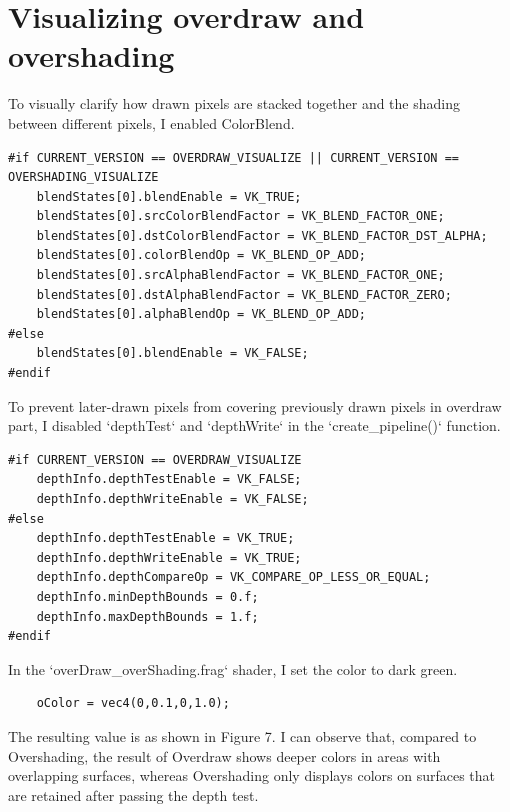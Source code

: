 \documentclass[10pt]{article}
\begin{document}
\section{Visualizing overdraw and overshading}

\noindent To visually clarify how drawn pixels are stacked together and the shading between different pixels, I enabled ColorBlend.

\begin{lstlisting}
#if CURRENT_VERSION == OVERDRAW_VISUALIZE || CURRENT_VERSION == OVERSHADING_VISUALIZE
    blendStates[0].blendEnable = VK_TRUE;
    blendStates[0].srcColorBlendFactor = VK_BLEND_FACTOR_ONE;
    blendStates[0].dstColorBlendFactor = VK_BLEND_FACTOR_DST_ALPHA;
    blendStates[0].colorBlendOp = VK_BLEND_OP_ADD;
    blendStates[0].srcAlphaBlendFactor = VK_BLEND_FACTOR_ONE;
    blendStates[0].dstAlphaBlendFactor = VK_BLEND_FACTOR_ZERO;
    blendStates[0].alphaBlendOp = VK_BLEND_OP_ADD; 
#else
    blendStates[0].blendEnable = VK_FALSE;
#endif
\end{lstlisting}

\noindent To prevent later-drawn pixels from covering previously drawn pixels in overdraw part, I disabled `depthTest` and `depthWrite` in the `create\_pipeline()` function.

\begin{lstlisting}
#if CURRENT_VERSION == OVERDRAW_VISUALIZE
    depthInfo.depthTestEnable = VK_FALSE;
    depthInfo.depthWriteEnable = VK_FALSE;
#else
    depthInfo.depthTestEnable = VK_TRUE;
    depthInfo.depthWriteEnable = VK_TRUE;
    depthInfo.depthCompareOp = VK_COMPARE_OP_LESS_OR_EQUAL;
    depthInfo.minDepthBounds = 0.f;
    depthInfo.maxDepthBounds = 1.f;
#endif 
\end{lstlisting}

\noindent In the `overDraw\_overShading.frag` shader, I set the color to dark green.

\begin{lstlisting}
	oColor = vec4(0,0.1,0,1.0);
\end{lstlisting}

\noindent The resulting value is as shown in Figure 7. 
I can observe that, compared to Overshading, the result of Overdraw shows deeper colors in areas with overlapping surfaces, whereas Overshading only displays colors on surfaces that are retained after passing the depth test.
\end{document}
